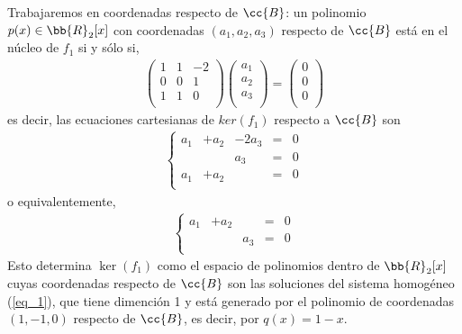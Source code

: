 \documentclass[12pt]{article}
\begin{document}
\begin{ejercicio}[2.5 puntos]
\begin{enumerate}
            Trabajaremos en coordenadas respecto de $\cc{B}$: un polinomio $p(x) \in \bb{R}_2[x]$ con coordenadas $(a_1,a_2,a_3)$ respecto de $\cc{B}$ está en el núcleo de $f_1$ si y sólo si,
            \begin{gather*}
                \begin{pmatrix}
                    1 & 1 & -2 \\
                    0 & 0 & 1 \\
                    1 & 1 & 0 \\
                \end{pmatrix}
                \begin{pmatrix}
                    a_1 \\
                    a_2 \\
                    a_3 \\
                \end{pmatrix}
                =
                \begin{pmatrix}
                    0 \\
                    0 \\
                    0 \\
                \end{pmatrix}
            \end{gather*}
            es decir, las ecuaciones cartesianas de $ker(f_1)$ respecto a $\cc{B}$ son
            \begin{gather*}
                \left\{
                    \begin{array}{ccccc}
                        a_1 & +a_2 & -2a_3 & = & 0 \\
                         &  & a_3 & = & 0 \\
                        a_1 & +a_2 &  & = & 0 \\
                    \end{array}
                \right.
            \end{gather*}
            o equivalentemente,
            \begin{gather} \label{eq_1}
                \left\{
                    \begin{array}{ccccc}
                        a_1 & +a_2 &  & = & 0 \\
                         &  & a_3 & = & 0 \\
                    \end{array}
                \right.
            \end{gather}
            Esto determina $\ker(f_1)$ como el espacio de polinomios dentro de $\bb{R}_2[x]$ cuyas coordenadas respecto de $\cc{B}$ son las soluciones del sistema homogéneo (\ref{eq_1}), que tiene dimención 1 y está generado por el polinomio de coordenadas $(1,-1,0)$ respecto de $\cc{B}$, es decir, por $q(x)=1-x$.


\end{enumerate}
\end{ejercicio}
\end{document}
